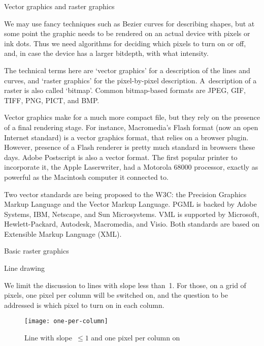  {Vector graphics and raster graphics}

We may use fancy techniques such as Bezier curves for describing
shapes, but at some point the graphic needs to be rendered on an actual
device with pixels or ink dots. Thus we need algorithms for deciding
which pixels to turn on or off, and, in case the device has a larger
bitdepth, with what intensity.

The technical terms here are `vector graphics'
for a description of the lines and curves, and
`raster graphics' for the pixel-by-pixel
description.
A~description of a raster is also called `bitmap'.
Common bitmap-based formats are JPEG, GIF, TIFF, PNG, PICT, and BMP.

Vector graphics make for a much more compact file, but they rely on
the presence of a final rendering stage. For instance, Macromedia's
Flash format (now an open Internet standard) is a vector graphics
format, that relies on a browser plugin. However, presence of a Flash
renderer is pretty much standard in browsers these days.
Adobe Postscript is also a vector format. The first popular printer to
incorporate it, the Apple Laserwriter, had a Motorola 68000 processor,
exactly as powerful as the Macintosh computer it connected to.

Two vector standards are being proposed to the W3C: the Precision
Graphics Markup Language and the Vector Markup Language. PGML is
backed by Adobe Systems, IBM, Netscape, and Sun Microsystems. VML is
supported by Microsoft, Hewlett-Packard, Autodesk, Macromedia, and
Visio. Both standards are based on Extensible Markup Language (XML).

 {Basic raster graphics}

 {Line drawing}

We limit the discussion to lines with slope less than~1. For those, on
a grid of pixels, one pixel per column will be switched on, and the
question to be addressed is which pixel to turn on in each column.
\begin{figure}
\texttt{[image: one-per-column]}
\caption{Line with slope~$\leq1$ and one pixel per column on}
\end{figure}

